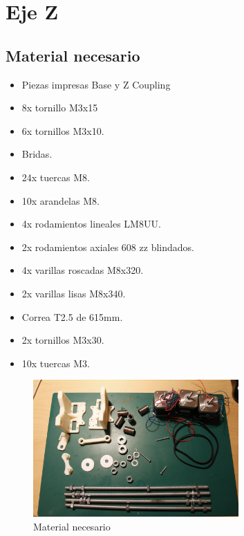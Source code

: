	\section{Eje Z}
	\subsection{Material necesario}
		\begin{itemize}
			\item Piezas impresas Base y Z Coupling
			\item 8x tornillo M3x15
			\item 6x tornillos M3x10.
			\item Bridas.
			\item 24x tuercas M8.
			\item 10x arandelas M8.
			\item 4x rodamientos lineales LM8UU.
			\item 2x rodamientos axiales 608 zz blindados.
			\item 4x varillas roscadas M8x320.
			\item 2x varillas lisas M8x340.
			\item Correa T2.5 de 615mm.
			\item 2x tornillos M3x30.
			\item 10x tuercas M3.

		\end{itemize}
		\begin{figure}[!htp]
			\centering
			\includegraphics[width=0.7\textwidth]{../../Fotos/67.jpg}
			\caption{Material necesario}
		\end{figure}
		\newpage{}
